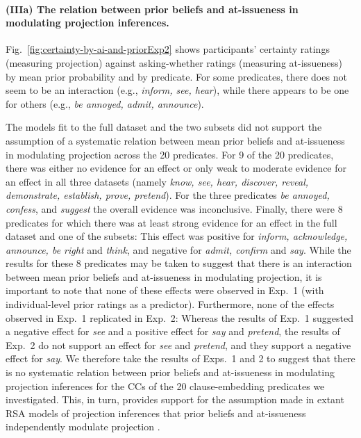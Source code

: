 \documentclass[11pt,fleqn]{article}
\newcommand{\6}{\mbox{$[\hspace*{-.6mm}[$}}
\newcommand{\9}{\mbox{$]\hspace*{-.6mm}]$}}
\begin{document}
\paragraph{(IIIa) The relation between prior beliefs and at-issueness in modulating projection inferences.} Fig.~\ref{fig:certainty-by-ai-and-priorExp2} shows participants' certainty ratings (measuring projection) against asking-whether ratings (measuring at-issueness) by mean prior probability and by predicate. For some predicates, there does not seem to be an interaction (e.g., {\em inform, see, hear}), while there appears to be one for others  (e.g., {\em be annoyed, admit, announce}). 

The models fit to the full dataset and the two subsets did not support the assumption of a systematic relation between mean prior beliefs and at-issueness in modulating projection across the 20 predicates. For 9 of the 20 predicates, there was either no evidence for an effect or only weak to moderate evidence for an effect in all three datasets (namely {\em know, see, hear, discover, reveal, demonstrate, establish, prove, pretend}). For the three predicates {\em be annoyed, confess}, and {\em suggest} the overall evidence was inconclusive.  Finally, there were 8 predicates for which there was at least strong evidence for an effect in the full dataset and one of the subsets: This effect was positive for {\em inform, acknowledge, announce, be right} and {\em think}, and negative for {\em admit, confirm} and {\em say}. While the results for these 8 predicates may be taken to suggest that there is an interaction between mean prior beliefs and at-issueness in modulating projection, it is important to note that none of these effects were observed in Exp.~1 (with individual-level prior ratings as a predictor). Furthermore, none of the effects observed in Exp.~1 replicated in Exp.~2: Whereas the results of Exp.~1 suggested a negative effect for {\em see} and a positive effect for {\em say} and {\em pretend}, the results of Exp.~2 do not support an effect for {\em see} and {\em pretend}, and they support a negative effect for {\em say}. We therefore take the results of Exps.~1 and 2 to suggest that there is no systematic relation between prior beliefs and at-issueness in modulating projection inferences for the CCs of the 20 clause-embedding predicates we investigated. This, in turn, provides support for the assumption made in extant RSA models of projection inferences that prior beliefs and at-issueness independently modulate projection \citep{qing-etal2016,stevens-etal2017,warstadt2022,pan-degen2023,scontras-tonhauser2025}.
\end{document}
